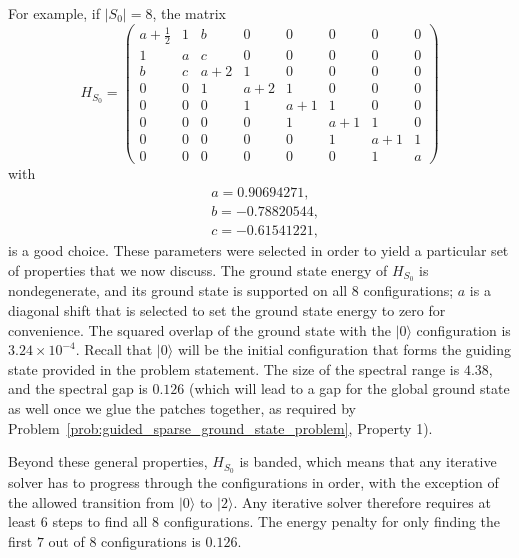 \documentclass[
  reprint,            %
  amsmath,amssymb,
  aps,
  superscriptaddress, %
  longbibliography
]{revtex4-2}
\theoremstyle{definition}
\begin{document}
For example, if $|S_0|=8$, the matrix 
\begin{equation}
\label{v36_base}
    H_{S_0}=
    \begin{pmatrix}
        a+\frac{1}{2}&1&b&0&0&0&0&0 \\
        1&a&c&0&0&0&0&0 \\
        b&c&a+2&1&0&0&0&0 \\
        0&0&1&a+2&1&0&0&0 \\
        0&0&0&1&a+1&1&0&0 \\
        0&0&0&0&1&a+1&1&0 \\
        0&0&0&0&0&1&a+1&1 \\
        0&0&0&0&0&0&1&a
    \end{pmatrix}
\end{equation}
with
\begin{equation}
\begin{split}
    &a = 0.90694271, \\
    &b = -0.78820544, \\
    &c = -0.61541221,
\end{split}
\end{equation}
is a good choice.
These parameters were selected in order to yield a particular set of properties that we now discuss.
The ground state energy of $H_{S_0}$ is nondegenerate, and its ground state is supported on all $8$ configurations; $a$ is a diagonal shift that is selected to set the ground state energy to zero for convenience.
The squared overlap of the ground state with the $|0\rangle$ configuration is $3.24\times10^{-4}$.
Recall that $|0\rangle$ will be the initial configuration that forms the guiding state provided in the problem statement.
The size of the spectral range is $4.38$, and the spectral gap is $0.126$ (which will lead to a gap for the global ground state as well once we glue the patches together, as required by Problem~\ref{prob:guided_sparse_ground_state_problem}, Property 1).

Beyond these general properties, $H_{S_0}$ is banded, which means that any iterative solver has to progress through the configurations in order, with the exception of the allowed transition from $|0\rangle$ to $|2\rangle$.
Any iterative solver therefore requires at least $6$ steps to find all $8$ configurations.
The energy penalty for only finding the first $7$ out of $8$ configurations is $0.126$.
\end{document}
